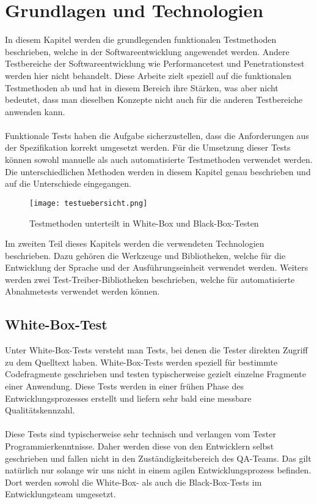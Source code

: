 ﻿\chapter{Grundlagen und Technologien}
\label{cha:StandDerTechnik}

In diesem Kapitel werden die grundlegenden funktionalen Testmethoden beschrieben, welche in der Softwareentwicklung angewendet werden. Andere Testbereiche der Softwareentwicklung wie Performancetest und Penetrationstest werden hier nicht behandelt. Diese Arbeite zielt speziell auf die funktionalen Testmethoden ab und hat in diesem Bereich ihre Stärken, was aber nicht bedeutet, dass man dieselben Konzepte nicht auch für die anderen Testbereiche anwenden kann. \\
\\
Funktionale Tests haben die Aufgabe sicherzustellen, dass die Anforderungen aus der Spezifikation korrekt umgesetzt werden. Für die Umsetzung dieser Tests können sowohl manuelle als auch automatisierte Testmethoden verwendet werden. Die unterschiedlichen Methoden werden in diesem Kapitel genau beschrieben und auf die Unterschiede eingegangen.

\begin{figure}
\centering
\caption{Testmethoden unterteilt in White-Box und Black-Box-Testen}
\texttt{[image: testuebersicht.png]}
\label{fig:testtypen}
\end{figure}

Im zweiten Teil dieses Kapitels werden die verwendeten Technologien beschrieben. Dazu gehören die Werkzeuge und Bibliotheken, welche für die Entwicklung der Sprache und der Ausführungseinheit verwendet werden. Weiters werden zwei Test-Treiber-Bibliotheken beschrieben, welche für automatisierte Abnahmetests verwendet werden können. 

\section{White-Box-Test}

Unter White-Box-Tests versteht man Tests, bei denen die Tester direkten Zugriff zu dem Quelltext haben. White-Box-Tests werden speziell für bestimmte Codefragmente geschrieben und testen typischerweise gezielt einzelne Fragmente einer Anwendung. Diese Tests werden in einer frühen Phase des Entwicklungsprozesses erstellt und liefern sehr bald eine messbare Qualitätskennzahl. \\
\\
Diese Tests sind typischerweise sehr technisch und verlangen vom Tester Programmierkenntnisse. Daher werden diese von den Entwicklern selbst geschrieben und fallen nicht in den Zuständigkeitsbereich des QA-Teams. Das gilt natürlich nur solange wir uns nicht in einem agilen Entwicklungsprozess befinden. Dort werden sowohl die White-Box- als auch die Black-Box-Tests im Entwicklungsteam umgesetzt.


